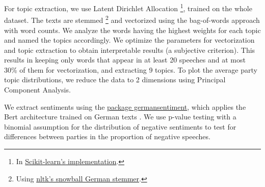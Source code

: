 \documentclass{article}
\begin{document}
For topic extraction, we use Latent Dirichlet Allocation
\footnote{In \href{https://scikit-learn.org/stable/modules/generated/sklearn.decomposition.LatentDirichletAllocation.html}{Scikit-learn's implementation}.},
trained on the whole dataset.
The texts are stemmed
\footnote{Using \href{https://www.nltk.org/_modules/nltk/stem/snowball.html}{nltk's snowball German stemmer}.}
and vectorized using the bag-of-words approach with word counts.
We analyze the words having the highest weights for each topic and named the topics accordingly.
We optimize the parameters for vectorization and topic extraction to obtain interpretable results (a subjective criterion).
This results in keeping only words that appear in at least 20 speeches and at most 30\% of them for vectorization, and extracting 9 topics.
To plot the average party topic distributions, we reduce the data to 2 dimensions using Principal Component Analysis.

We extract sentiments using the \href{https://pypi.org/project/germansentiment/}{package germansentiment}, which applies the Bert architecture trained on German texts \cite{Germansentiment}.
We use p-value testing with a binomial assumption for the distribution of negative sentiments to test for differences between parties in the proportion of negative speeches.
\end{document}
